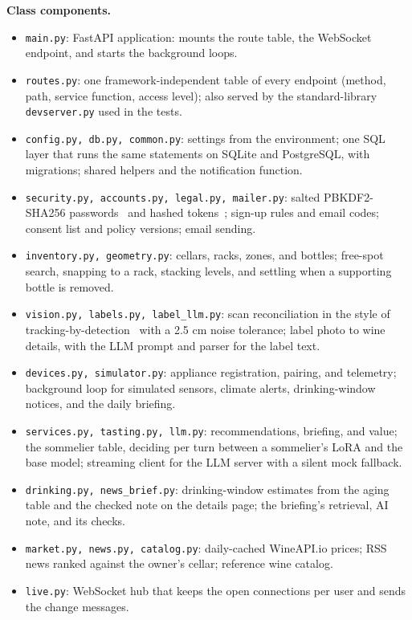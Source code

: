 \documentclass[conference]{IEEEtran}
\begin{document}
\textbf{Class components.}
\begin{itemize}
    \item \texttt{main.py}: FastAPI application: mounts the route table, the WebSocket endpoint, and starts the background loops.
    \item \texttt{routes.py}: one framework-independent table of every endpoint (method, path, service function, access level); also served by the standard-library \texttt{devserver.py} used in the tests.
    \item \texttt{config.py, db.py, common.py}: settings from the environment; one SQL layer that runs the same statements on SQLite and PostgreSQL, with migrations; shared helpers and the notification function.
    \item \texttt{security.py, accounts.py, legal.py, mailer.py}: salted PBKDF2-SHA256 passwords~\cite{pbkdf2} and hashed tokens~\cite{bearer}; sign-up rules and email codes; consent list and policy versions; email sending.
    \item \texttt{inventory.py, geometry.py}: cellars, racks, zones, and bottles; free-spot search, snapping to a rack, stacking levels, and settling when a supporting bottle is removed.
    \item \texttt{vision.py, labels.py, label\_llm.py}: scan reconciliation in the style of tracking-by-detection~\cite{sort} with a 2.5 cm noise tolerance; label photo to wine details, with the LLM prompt and parser for the label text.
    \item \texttt{devices.py, simulator.py}: appliance registration, pairing, and telemetry; background loop for simulated sensors, climate alerts, drinking-window notices, and the daily briefing.
    \item \texttt{services.py, tasting.py, llm.py}: recommendations, briefing, and value; the sommelier table, deciding per turn between a sommelier's LoRA and the base model; streaming client for the LLM server with a silent mock fallback.
    \item \texttt{drinking.py, news\_brief.py}: drinking-window estimates from the aging table and the checked note on the details page; the briefing's retrieval, AI note, and its checks.
    \item \texttt{market.py, news.py, catalog.py}: daily-cached WineAPI.io prices; RSS news ranked against the owner's cellar; reference wine catalog.
    \item \texttt{live.py}: WebSocket hub that keeps the open connections per user and sends the change messages.
\end{itemize}
\end{document}

